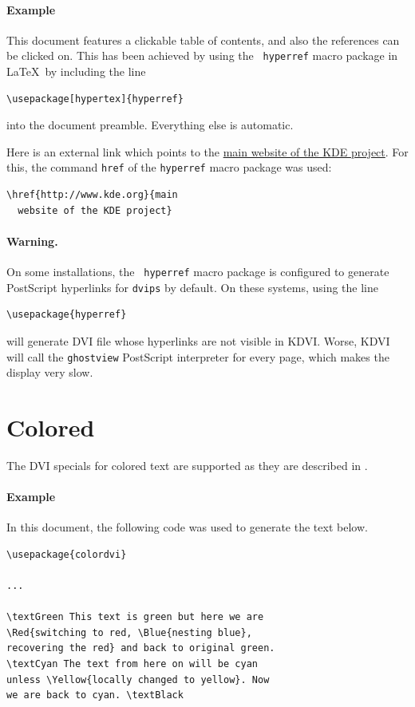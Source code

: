 \documentclass{article}
\begin{document}
\paragraph*{Example}
This document features a clickable table of contents, and also the
references can be clicked on. This has been achieved by using the {\tt
  hyperref} macro package in \LaTeX\ by including the line
\begin{verbatim}
\usepackage[hypertex]{hyperref}
\end{verbatim}
into the document preamble. Everything else is automatic.

Here is an external link which points to the \href{http://www.kde.org}{main
  website of the KDE project}. For this, the command {\tt href} of the
{\tt hyperref} macro package was used:
\begin{verbatim}
\href{http://www.kde.org}{main
  website of the KDE project}
\end{verbatim}


\paragraph{Warning.} On some installations, the {\tt
  hyperref} macro package is configured to generate PostScript
hyperlinks for {\tt dvips} by default. On these systems, using the
line
\begin{verbatim}
\usepackage{hyperref}
\end{verbatim}
will generate DVI file whose hyperlinks are not visible in KDVI.
Worse, KDVI will call the {\tt ghostview} PostScript interpreter for
every page, which makes the display very slow.



\section{Colored   }

The DVI specials for colored text are supported as they are described
in \cite{dvips}. 

\paragraph*{Example} In this document, the following code was used to
generate the text below.
\begin{verbatim}
\usepackage{colordvi}

...

\textGreen This text is green but here we are
\Red{switching to red, \Blue{nesting blue}, 
recovering the red} and back to original green.
\textCyan The text from here on will be cyan 
unless \Yellow{locally changed to yellow}. Now
we are back to cyan. \textBlack
\end{verbatim}
\end{document}
